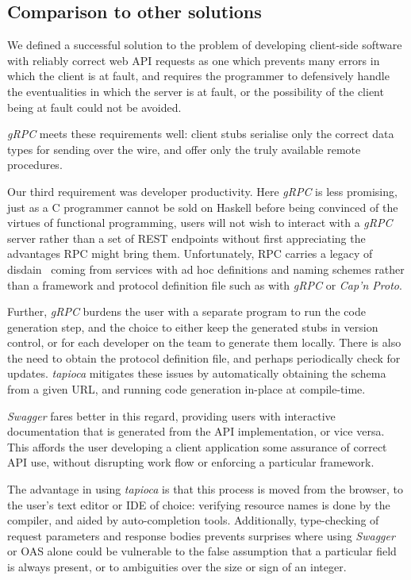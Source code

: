 \subsection{Comparison to other solutions} \label{eval:comparison}

We defined a successful solution to the problem of developing client-side software with reliably correct web API requests  as one which prevents many errors in which the client is at fault, and requires the programmer to defensively handle the eventualities in which the server is at fault, or the possibility of the client being at fault could not be avoided. 

\emph{gRPC} meets these requirements well: client stubs serialise only the correct data types for sending over the wire, and offer only the truly available remote procedures. 

Our third requirement was developer productivity.  Here \emph{gRPC} is less promising, just as a C programmer cannot be sold on Haskell before being convinced of the virtues of functional programming, users will not wish to interact with a \emph{gRPC} server rather than a set of REST endpoints without first appreciating the advantages RPC might bring them. Unfortunately, RPC carries a legacy of disdain~\cite{why_you_prefer_rest_rpc} coming from services with ad hoc definitions and naming schemes rather than a framework and protocol definition file such as with \emph{gRPC} or \emph{Cap'n Proto}.

Further, \emph{gRPC} burdens the user with a separate program to run the code generation step, and the choice to either keep the generated stubs in version control, or for each developer on the team to generate them locally. There is also the need to obtain the protocol definition file, and perhaps periodically check for updates. \emph{tapioca} mitigates these issues by automatically obtaining the schema from a given URL, and running code generation in-place at compile-time.

\emph{Swagger} fares better in this regard, providing users with interactive documentation that is generated from the API implementation, or vice versa. This affords the user developing a client application some assurance of correct API use, without disrupting work flow or enforcing a particular framework.

The advantage in using \emph{tapioca} is that this process is moved from the browser, to the user's text editor or IDE of choice: verifying resource names is done by the compiler, and aided by auto-completion tools. Additionally, type-checking of request parameters and response bodies prevents surprises where using \emph{Swagger} or OAS alone could be vulnerable to the false assumption that a particular field is always present, or to ambiguities over the size or sign of an integer.